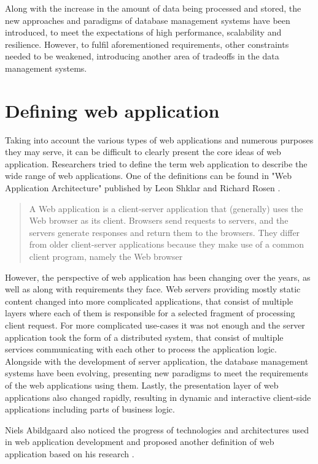 Along with the increase in the amount of data being processed and stored, the new approaches and paradigms of database management systems have been introduced, to meet the expectations of high performance, scalability and resilience. However, to fulfil aforementioned requirements, other constraints needed to be weakened, introducing another area of tradeoffs in the data management systems.

\section{Defining web application}

Taking into account the various types of web applications and numerous purposes they may serve, it can be difficult to clearly present the core ideas of web application. Researchers tried to define the term web application to describe the wide range of web applications. One of the definitions can be found in "Web Application Architecture" published by Leon Shklar and Richard Rosen \cite{WebAppArchitecture}.

\begin{quotation}
A Web application is a client-server application that (generally) uses the Web browser as its client. Browsers send requests to servers, and the servers generate responses and return them to the browsers. They differ from older client-server applications because they make use of a common client program, namely the Web browser
\end{quotation}

However, the perspective of web application has been changing over the years, as well as along with requirements they face. Web servers providing mostly static content changed into more complicated applications, that consist of multiple layers where each of them is responsible for a selected fragment of processing client request. For more complicated use-cases it was not enough and the server application took the form of a distributed system, that consist of multiple services communicating with each other to process the application logic. Alongside with the development of server application, the database management systems have been evolving, presenting new paradigms to meet the requirements of the web applications using them. Lastly, the presentation layer of web applications also changed rapidly, resulting in dynamic and interactive client-side applications including parts of business logic.

Niels Abildgaard also noticed the progress of technologies and architectures used in web application development and proposed another definition of web application based on his research \cite{PerspectivesOnArchitectureEvolution}.

